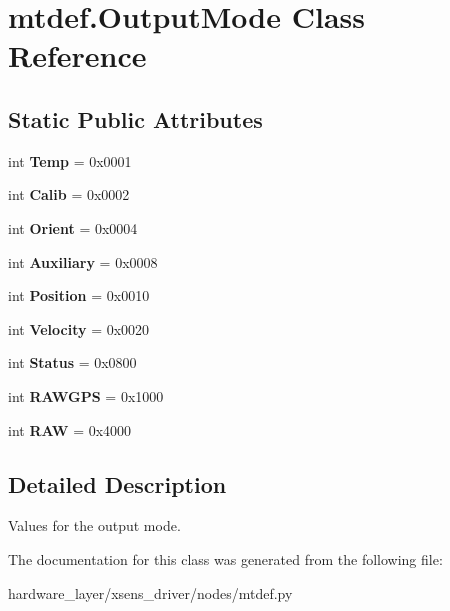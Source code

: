 \hypertarget{classmtdef_1_1OutputMode}{}\section{mtdef.\+Output\+Mode Class Reference}
\label{classmtdef_1_1OutputMode}
\subsection*{Static Public Attributes}
\begin{DoxyCompactItemize}
\item 
\mbox{\label{classmtdef_1_1OutputMode_ac5c68dcf874d1e2982a8296727639e54}} 
int {\bfseries Temp} = 0x0001
\item 
\mbox{\label{classmtdef_1_1OutputMode_a6f5d09a03cade7d3a04d07cb487520e3}} 
int {\bfseries Calib} = 0x0002
\item 
\mbox{\label{classmtdef_1_1OutputMode_a031a1c61927f3039f6d9271fae79be36}} 
int {\bfseries Orient} = 0x0004
\item 
\mbox{\label{classmtdef_1_1OutputMode_a9e5152e494ecf666df741c9999cbc777}} 
int {\bfseries Auxiliary} = 0x0008
\item 
\mbox{\label{classmtdef_1_1OutputMode_acaf9bc94db44bd7286444d26c77f2d58}} 
int {\bfseries Position} = 0x0010
\item 
\mbox{\label{classmtdef_1_1OutputMode_afd059ee03dd482940f9fdcd40247aef4}} 
int {\bfseries Velocity} = 0x0020
\item 
\mbox{\label{classmtdef_1_1OutputMode_a2008da9ce384717cd66f084d25779160}} 
int {\bfseries Status} = 0x0800
\item 
\mbox{\label{classmtdef_1_1OutputMode_a71c49d935984f8be8cfebbf2ed577cf0}} 
int {\bfseries R\+A\+W\+G\+PS} = 0x1000
\item 
\mbox{\label{classmtdef_1_1OutputMode_afcadd4cfb477338178688ab2d8ed7062}} 
int {\bfseries R\+AW} = 0x4000
\end{DoxyCompactItemize}


\subsection{Detailed Description}
\begin{DoxyVerb}Values for the output mode.\end{DoxyVerb}
 

The documentation for this class was generated from the following file\+:\begin{DoxyCompactItemize}
\item 
hardware\+\_\+layer/xsens\+\_\+driver/nodes/mtdef.\+py\end{DoxyCompactItemize}
